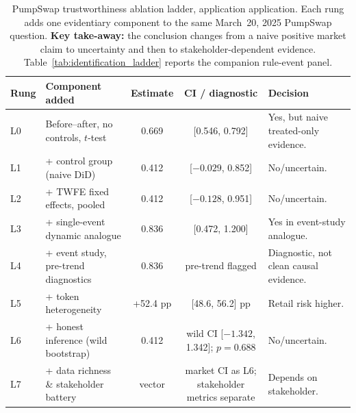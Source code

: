 \begin{table}[t]
  \caption{PumpSwap trustworthiness ablation ladder, application application. Each
  rung adds one evidentiary component to the same March~20, 2025 PumpSwap
  question. \textbf{Key take-away:} the conclusion changes from a naive
  positive market claim to uncertainty and then to stakeholder-dependent
  evidence. Table~\ref{tab:identification_ladder} reports the companion rule-event panel.}
  \label{tab:ablation}
  \centering
  \footnotesize
  \setlength{\tabcolsep}{4pt}
  \begin{tabularx}{\textwidth}{@{}l >{\raggedright\arraybackslash}X c c >{\raggedright\arraybackslash}X@{}}
    \toprule
    \textbf{Rung} & \textbf{Component added} & \textbf{Estimate} &
    \textbf{CI / diagnostic} & \textbf{Decision} \\
    \midrule
    L0 & Before--after, no controls, $t$-test
      & 0.669 & [0.546, 0.792] & Yes, but naive treated-only evidence. \\
    L1 & + control group (naive DiD)
      & 0.412 & [$-0.029$, 0.852] & No/uncertain. \\
    L2 & + TWFE fixed effects, pooled
      & 0.412 & [$-0.128$, 0.951] & No/uncertain. \\
    L3 & + single-event dynamic analogue
      & 0.836 & [0.472, 1.200] & Yes in event-study analogue. \\
    L4 & + event study, pre-trend diagnostics
      & 0.836 & pre-trend flagged & Diagnostic, not clean causal evidence. \\
    L5 & + token heterogeneity
      & +52.4 pp & [48.6, 56.2] pp & Retail risk higher. \\
    L6 & + honest inference (wild bootstrap)
      & 0.412 & wild CI [$-1.342$, 1.342]; $p=0.688$ & No/uncertain. \\
    \rowcolor{okgreen!8}
    L7 & + data richness \& stakeholder battery
      & vector & market CI as L6; stakeholder metrics separate &
      Depends on stakeholder. \\
    \bottomrule
  \end{tabularx}
\end{table}
